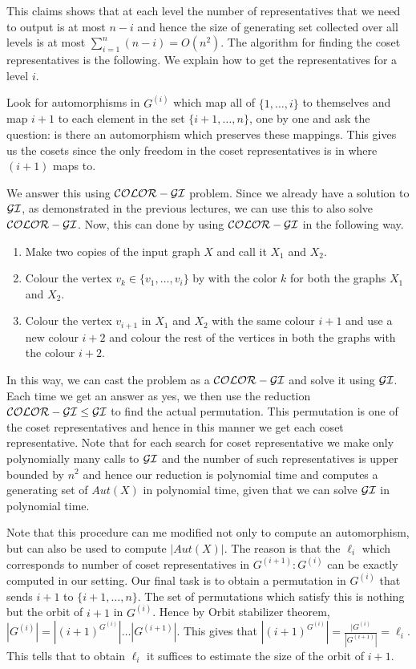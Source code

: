 This claims shows that at each level the number of representatives that we
need to output is at most $n-i$ and hence the size of generating set collected
over all levels is at most $\sum_{i=1}^n (n-i) = O(n^2)$.
The algorithm for finding the coset representatives is the following. We
explain how to get the representatives for a level $i$.

Look for automorphisms in $G^{(i)}$ which map all of $\{1, \ldots, i\}$ to
themselves and map $i+1$ to each element in the set $\{i+1, \ldots,n\}$, one
by one and ask the question: is there an automorphism which preserves these
mappings. This gives us the cosets since the only freedom in the coset
representatives is in where $(i+1)$ maps to. 

We answer this using $\mathcal{COLOR-GI}$ problem. Since we already have a solution to
$\mathcal{GI}$, as demonstrated in the previous lectures, we can use this to also 
solve $\mathcal{COLOR-GI}$. Now, this can done by using $\mathcal{COLOR-GI}$ in the following way. 

\begin{enumerate}
	\item Make two copies of the input graph $X$ and call it $X_1$ and
		$X_2$.
	\item Colour the vertex  $v_k \in \{v_1, \ldots, v_i\}$ by  with the
		color $k$ for both the graphs $X_1$ and $X_2$. 
	\item Colour the vertex $v_{i+1}$ in $X_1$ and $X_2$ with the same
		colour $i+1$ and use a new colour $i+2$ and colour the rest of 
		the vertices in both the graphs with the colour $i+2$.
\end{enumerate}

In this way, we can cast the problem as a $\mathcal{COLOR-GI}$ and solve it using
$\cal{GI}$. Each time we get an answer as yes, we then use the reduction
$\mathcal{COLOR-GI} \le \mathcal{GI}$ to find the actual permutation. This
permutation is one of the coset representatives and hence in this manner we
get each coset representative. Note that for each search for coset
representative we make only polynomially many calls to $\cal{GI}$ and the
number of such representatives is upper bounded by $n^2$ and hence our
reduction is polynomial time and computes a generating set of $Aut(X)$ in
polynomial time, given that we can solve $\cal{GI}$ in polynomial time.

Note that this procedure can me modified not only to compute an automorphism,
but can also be used to compute $|Aut(X)|$. The reason is that the $\ell_i$
which corresponds to number of coset representatives in $G^{(i+1)}:G^{(i)}$
can be exactly computed in our setting. Our final task is to obtain a
permutation in $G^{(i)}$ that sends $i+1$ to $\{i+1,\ldots,n\}$. The set of
permutations which satisfy this is nothing but the orbit of $i+1$ in
$G^{(i)}$. Hence by Orbit stabilizer theorem, $|G^{(i)}| = \left
|(i+1)^{G^{(i)}} \right |\ldots |G^{(i+1)}|$. This gives that $\left |
(i+1)^{G^{(i)}} \right | = \frac{|G^{(i)}}{|G^{(i+1)}|} = \ell_i$. This tells
that to obtain $\ell_i$ it suffices to estimate the size of the orbit of
$i+1$.

